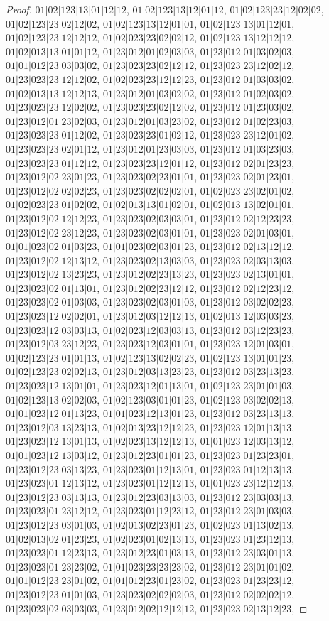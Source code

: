 \documentclass[12pt]{article}
\theoremstyle{plain}
\theoremstyle{definition}
\theoremstyle{remark}
\begin{document}
\begin{proof}
$01|02|123|13|01|12|12$, $01|02|123|13|12|01|12$, $01|02|123|23|12|02|02$, $01|02|123|23|02|12|02$, $01|02|123|13|12|01|01$, $01|02|123|13|01|12|01$, $01|02|123|23|12|12|12$, $01|02|023|23|02|02|12$, $01|02|123|13|12|12|12$, $01|02|013|13|01|01|12$, $01|23|012|01|02|03|03$, $01|23|012|01|03|02|03$, $01|01|012|23|03|03|02$, $01|23|023|23|02|12|12$, $01|23|023|23|12|02|12$, $01|23|023|23|12|12|02$, $01|02|023|23|12|12|23$, $01|23|012|01|03|03|02$, $01|02|013|13|12|12|13$, $01|23|012|01|03|02|02$, $01|23|012|01|02|03|02$, $01|23|023|23|12|02|02$, $01|23|023|23|02|12|02$, $01|23|012|01|23|03|02$, $01|23|012|01|23|02|03$, $01|23|012|01|03|23|02$, $01|23|012|01|02|23|03$, $01|23|023|23|01|12|02$, $01|23|023|23|01|02|12$, $01|23|023|23|12|01|02$, $01|23|023|23|02|01|12$, $01|23|012|01|23|03|03$, $01|23|012|01|03|23|03$, $01|23|023|23|01|12|12$, $01|23|023|23|12|01|12$, $01|23|012|02|01|23|23$, $01|23|012|02|23|01|23$, $01|23|023|02|23|01|01$, $01|23|023|02|01|23|01$, $01|23|012|02|02|02|23$, $01|23|023|02|02|02|01$, $01|02|023|23|02|01|02$, $01|02|023|23|01|02|02$, $01|02|013|13|01|02|01$, $01|02|013|13|02|01|01$, $01|23|012|02|12|12|23$, $01|23|023|02|03|03|01$, $01|23|012|02|12|23|23$, $01|23|012|02|23|12|23$, $01|23|023|02|03|01|01$, $01|23|023|02|01|03|01$, $01|01|023|02|01|03|23$, $01|01|023|02|03|01|23$, $01|23|012|02|13|12|12$, $01|23|012|02|12|13|12$, $01|23|023|02|13|03|03$, $01|23|023|02|03|13|03$, $01|23|012|02|13|23|23$, $01|23|012|02|23|13|23$, $01|23|023|02|13|01|01$, $01|23|023|02|01|13|01$, $01|23|012|02|23|12|12$, $01|23|012|02|12|23|12$, $01|23|023|02|01|03|03$, $01|23|023|02|03|01|03$, $01|23|012|03|02|02|23$, $01|23|023|12|02|02|01$, $01|23|012|03|12|12|13$, $01|02|013|12|03|03|23$, $01|23|023|12|03|03|13$, $01|02|023|12|03|03|13$, $01|23|012|03|12|23|23$, $01|23|012|03|23|12|23$, $01|23|023|12|03|01|01$, $01|23|023|12|01|03|01$, $01|02|123|23|01|01|13$, $01|02|123|13|02|02|23$, $01|02|123|13|01|01|23$, $01|02|123|23|02|02|13$, $01|23|012|03|13|23|23$, $01|23|012|03|23|13|23$, $01|23|023|12|13|01|01$, $01|23|023|12|01|13|01$, $01|02|123|23|01|01|03$, $01|02|123|13|02|02|03$, $01|02|123|03|01|01|23$, $01|02|123|03|02|02|13$, $01|01|023|12|01|13|23$, $01|01|023|12|13|01|23$, $01|23|012|03|23|13|13$, $01|23|012|03|13|23|13$, $01|02|013|23|12|12|23$, $01|23|023|12|01|13|13$, $01|23|023|12|13|01|13$, $01|02|023|13|12|12|13$, $01|01|023|12|03|13|12$, $01|01|023|12|13|03|12$, $01|23|012|23|01|01|23$, $01|23|023|01|23|23|01$, $01|23|012|23|03|13|23$, $01|23|023|01|12|13|01$, $01|23|023|01|12|13|13$, $01|23|023|01|12|13|12$, $01|23|023|01|12|12|13$, $01|01|023|23|12|12|13$, $01|23|012|23|03|13|13$, $01|23|012|23|03|13|03$, $01|23|012|23|03|03|13$, $01|23|023|01|23|12|12$, $01|23|023|01|12|23|12$, $01|23|012|23|01|03|03$, $01|23|012|23|03|01|03$, $01|02|013|02|23|01|23$, $01|02|023|01|13|02|13$, $01|02|013|02|01|23|23$, $01|02|023|01|02|13|13$, $01|23|023|01|23|12|13$, $01|23|023|01|12|23|13$, $01|23|012|23|01|03|13$, $01|23|012|23|03|01|13$, $01|23|023|01|23|23|02$, $01|01|023|23|23|23|02$, $01|23|012|23|01|01|02$, $01|01|012|23|23|01|02$, $01|01|012|23|01|23|02$, $01|23|023|01|23|23|12$, $01|23|012|23|01|01|03$, $01|23|023|02|02|02|03$, $01|23|012|02|02|02|12$, $01|23|023|02|03|03|03$, $01|23|012|02|12|12|12$, $01|23|023|02|13|12|23$, 
\end{proof}
\end{document}
